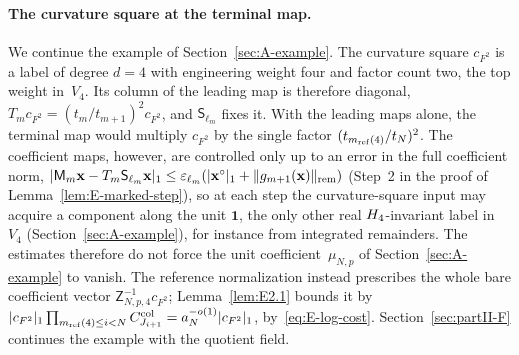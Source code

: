 \paragraph{The curvature square at the terminal map.} We continue the example of Section~\ref{sec:A-example}. The curvature square $c_{F^2}$ is a label of degree $d=4$ with engineering weight four and factor count two, the top weight in~$V_4$. Its column of the leading map is therefore diagonal, $T_mc_{F^2}=(t_m/t_{m+1})^2c_{F^2}$, and $\mathsf S_{\ell_m}$ fixes it. With the leading maps alone, the terminal map would multiply $c_{F^2}$ by the single factor $(t_{m_{\mathrm{ref}}(4)}/t_N)^2$. The coefficient maps, however, are controlled only up to an error in the full coefficient norm, $|\mathsf M_m\mathbf x-T_m\mathsf S_{\ell_m}\mathbf x|_1\le\varepsilon_{\ell_m}(|\mathbf x^\circ|_1+\|g_{m+1}(\mathbf x)\|_{\rm rem})$ (Step~2 in the proof of Lemma~\ref{lem:E-marked-step}), so at each step the curvature-square input may acquire a component along the unit $\mathbf1$, the only other real $H_4$-invariant label in~$V_4$ (Section~\ref{sec:A-example}), for instance from integrated remainders. The estimates therefore do not force the unit coefficient~$\mu_{N,p}$ of Section~\ref{sec:A-example} to vanish. The reference normalization instead prescribes the whole bare coefficient vector $\mathsf Z_{N,p,4}^{-1}c_{F^2}$; Lemma~\ref{lem:E2.1} bounds it by $|c_{F^2}|_1\prod_{m_{\mathrm{ref}}(4)\le i<N}C^{\rm col}_{J_{i+1}}=a_N^{-o(1)}|c_{F^2}|_1$, by~\eqref{eq:E-log-cost}. Section~\ref{sec:partII-F} continues the example with the quotient field.

